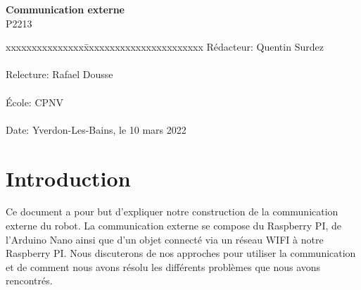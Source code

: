 \documentclass[
	a4paper,									%
	11pt,										%
	twoside,									%
	openright,									%
	notitlepage,									%
	parskip=half,								%
]{scrreprt}										%
\begin{document}
\begin{titlepage}
	\vspace{3cm}

	\fontsize{30pt}{32pt}\selectfont 
	\noindent \textbf{Communication externe} \\

	\fontsize{18pt}{20pt}\selectfont\vspace{0.3em} P2213 \\

	\vspace{4cm}
	\fontsize{12pt}{15pt}\selectfont
	\begin{tabbing}
		xxxxxxxxxxxxxxx\=xxxxxxxxxxxxxxxxxxxxxxx \kill
		Rédacteur:\> Quentin Surdez\\ \\
		Relecture:\> Rafael Dousse\\ \\
		École:\> CPNV\\ \\
		Date:\> Yverdon-Les-Bains, le 10 mars 2022\\%
	\end{tabbing}
\end{titlepage}

\tableofcontents

\cleardoublepage

\setcounter{page}{1}

\chapter{Introduction}
Ce document a pour but d'expliquer notre construction de la communication externe du robot. 
La communication externe se compose du Raspberry PI, de l'Arduino Nano ainsi que d'un 
objet connecté via un réseau WIFI à notre Raspberry PI. Nous discuterons de nos approches pour utiliser la communication
et de comment nous avons résolu les différents problèmes que nous avons rencontrés. 
\end{document}
